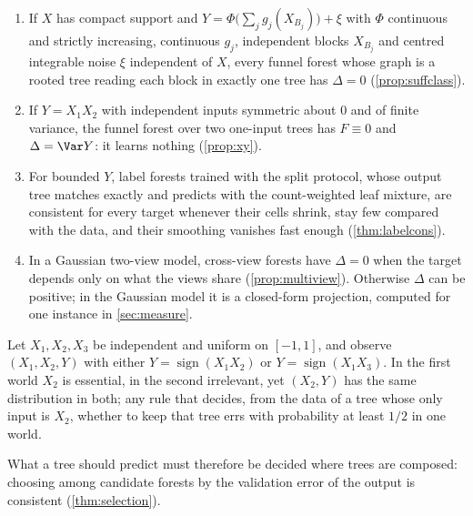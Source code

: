 \begin{proposition}\label{prop:tasks}
\leavevmode
\begin{enumerate}[label=(\alph*),leftmargin=*,noitemsep]
\item If $X$ has compact support and $Y=\Phi\bigl(\sum_jg_j(X_{B_j})\bigr)+\xi$ with $\Phi$
  continuous and strictly increasing, continuous $g_j$, independent blocks $X_{B_j}$ and
  centred integrable noise $\xi$ independent of $X$, every
  funnel forest whose graph is a rooted tree reading each block in exactly one tree has
  $\Delta=0$ (\cref{prop:suffclass}).
\item If $Y=X_1X_2$ with independent inputs symmetric about $0$ and of finite variance, the funnel forest over two
  one-input trees has $F\equiv0$ and $\Delta=\Var Y$: it learns nothing (\cref{prop:xy}).
\item For bounded $Y$, label forests trained with the split protocol, whose output tree
  matches exactly and predicts with the count-weighted leaf mixture, are consistent for every
  target whenever their cells shrink, stay few compared with the data, and their smoothing
  vanishes fast enough (\cref{thm:labelcons}).
\item In a Gaussian two-view model, cross-view forests have $\Delta=0$ when the target
  depends only on what the views share (\cref{prop:multiview}).  Otherwise $\Delta$ can be
  positive; in the Gaussian model it is a closed-form projection, computed for one instance in
  \cref{sec:measure}.
\end{enumerate}
\end{proposition}

\begin{proposition}\label{prop:local}
Let $X_1,X_2,X_3$ be independent and uniform on $[-1,1]$, and observe $(X_1,X_2,Y)$ with
either $Y=\operatorname{sign}(X_1X_2)$ or $Y=\operatorname{sign}(X_1X_3)$.  In the first world
$X_2$ is essential, in the second irrelevant, yet $(X_2,Y)$ has the same distribution in
both; any rule that decides, from the data of a tree whose only input is $X_2$, whether to
keep that tree errs with probability at least $1/2$ in one world.
\end{proposition}

What a tree should predict must therefore be decided where trees are composed: choosing
among candidate forests by the validation error of the output is consistent
(\cref{thm:selection}).

